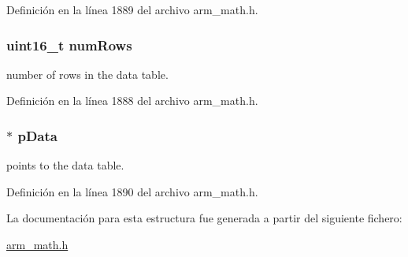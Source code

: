 Definición en la línea 1889 del archivo arm\+\_\+math.\+h.

\subsubsection[{\texorpdfstring{num\+Rows}{numRows}}]{\setlength{\rightskip}{0pt plus 5cm}uint16\+\_\+t num\+Rows}\hypertarget{structarm__bilinear__interp__instance__q7_a1bcf80ccdc2acc29198f1592ae300390}{}\label{structarm__bilinear__interp__instance__q7_a1bcf80ccdc2acc29198f1592ae300390}
number of rows in the data table. 

Definición en la línea 1888 del archivo arm\+\_\+math.\+h.

\subsubsection[{\texorpdfstring{p\+Data}{pData}}]{$\ast$ p\+Data}\hypertarget{structarm__bilinear__interp__instance__q7_afde7546ea2ec5df9fe42fb04d128a016}{}\label{structarm__bilinear__interp__instance__q7_afde7546ea2ec5df9fe42fb04d128a016}
points to the data table. 

Definición en la línea 1890 del archivo arm\+\_\+math.\+h.



La documentación para esta estructura fue generada a partir del siguiente fichero\+:\begin{DoxyCompactItemize}
\item 
\hyperlink{arm__math_8h}{arm\+\_\+math.\+h}\end{DoxyCompactItemize}
